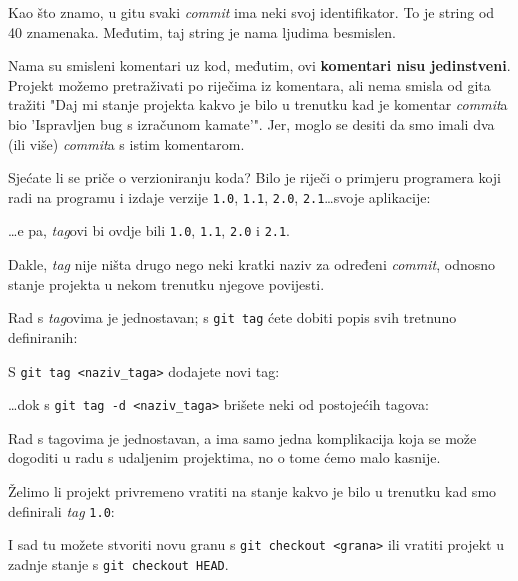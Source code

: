 Kao što znamo, u gitu svaki \emph{commit} ima neki svoj identifikator. 
To je string od 40 znamenaka.
Međutim, taj string je nama ljudima besmislen.

Nama su smisleni komentari uz kod, međutim, ovi \textbf{komentari nisu jedinstveni}.
Projekt možemo pretraživati po riječima iz komentara, ali nema smisla od gita tražiti "Daj mi stanje projekta kakvo je bilo u trenutku kad je komentar \emph{commit}a bio 'Ispravljen bug s izračunom kamate'".
Jer, moglo se desiti da smo imali dva (ili više) \emph{commit}a s istim komentarom.

Sjećate li se priče o verzioniranju koda?
Bilo je riječi o primjeru programera koji radi na programu i izdaje verzije \verb+1.0+, \verb+1.1+, \verb+2.0+, \verb+2.1+\dots svoje aplikacije:



\dots{}e pa, \emph{tag}ovi bi ovdje bili \verb+1.0+, \verb+1.1+, \verb+2.0+ i \verb+2.1+.

Dakle, \emph{tag} nije ništa drugo nego neki kratki naziv za određeni \emph{commit}, odnosno stanje projekta u nekom trenutku njegove povijesti.

Rad s \emph{tag}ovima je jednostavan; s \verb+git tag+ ćete dobiti popis svih tretnuno definiranih:



S \verb+git tag <naziv_taga>+ dodajete novi tag:


\dots{}dok s \verb+git tag -d <naziv_taga>+ brišete neki od postojećih tagova:


Rad s tagovima je jednostavan, a ima samo jedna komplikacija koja se može dogoditi u radu s udaljenim projektima, no o tome ćemo malo kasnije.

Želimo li projekt privremeno vratiti na stanje kakvo je bilo u trenutku kad smo definirali \emph{tag} \verb+1.0+:


I sad tu možete stvoriti novu granu s \verb+git checkout <grana>+ ili vratiti projekt u zadnje stanje s \verb+git checkout HEAD+.
